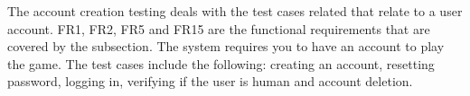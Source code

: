\documentclass[12pt, titlepage]{article}
\begin{document}
The account creation testing deals with the test cases related that relate to a user account. FR1, FR2, FR5 and FR15 are the functional requirements that are covered by the subsection. The system requires you to have an account to play the game. The test cases include the following: creating an account, resetting password, logging in, verifying if the user is human and account deletion.


\end{document}
